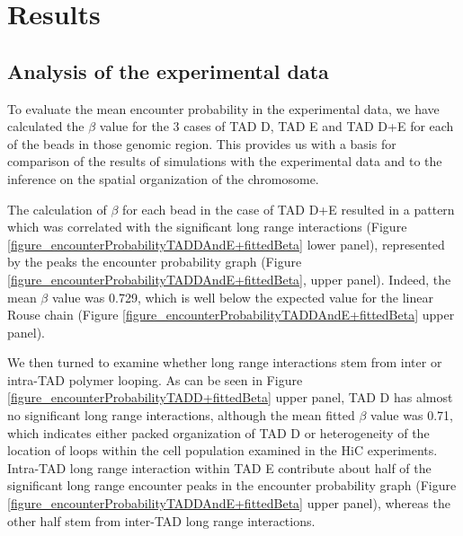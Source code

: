 \documentclass[12pt]{paper}
\begin{document}






\section{Results}\label{section_results}
\subsection{Analysis of the experimental data}\label{subsection_analysisOfTheExperimentalData}

To evaluate the mean encounter probability in the experimental data, we have calculated the $\beta$ value for the 3 cases of TAD D, TAD E and TAD D+E for each of the beads in those genomic region. This provides us with a basis for comparison of the results of simulations with the experimental data and to the inference on the spatial organization of the chromosome. 

The calculation of $\beta$ for each bead in the case of TAD D+E resulted in a pattern which was correlated with the significant long range interactions (Figure \ref{figure_encounterProbabilityTADDAndE+fittedBeta} lower panel), represented by the peaks the encounter probability graph (Figure \ref{figure_encounterProbabilityTADDAndE+fittedBeta}, upper panel). Indeed, the mean $\beta$ value was 0.729, which is well below the expected value for the linear Rouse chain (Figure \ref{figure_encounterProbabilityTADDAndE+fittedBeta} upper panel). 

We then turned to examine whether long range interactions stem from inter or intra-TAD polymer looping. As can be seen in Figure \ref{figure_encounterProbabilityTADD+fittedBeta} upper panel, TAD D has almost no significant long range interactions, although the mean fitted $\beta$ value was 0.71, which indicates either packed organization of TAD D or heterogeneity of the location of loops within the cell population examined in the HiC experiments. 
Intra-TAD long range interaction within TAD E contribute about half of the significant long range encounter peaks in the encounter probability graph (Figure \ref{figure_encounterProbabilityTADDAndE+fittedBeta} upper panel), whereas the other half stem from inter-TAD long range interactions. 
\end{document}
